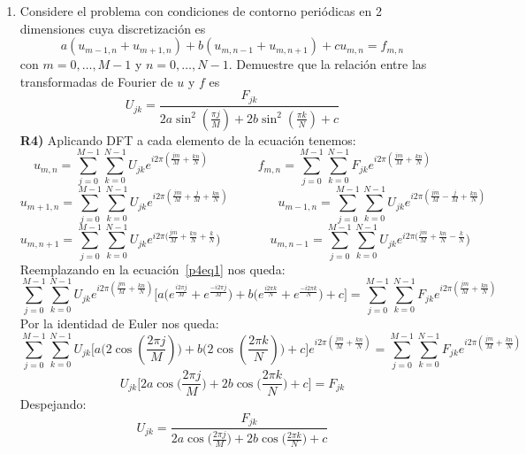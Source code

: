\documentclass{article}
\begin{document}
\begin{enumerate}
    \item Considere el problema con condiciones de contorno periódicas en 2 dimensiones cuya discretización es
    \begin{equation}\label{p4eq1}
        a(u_{m-1,n} + u_{m+1,n}) + b(u_{m,n-1}+u_{m,n+1}) + cu_{m,n} = f_{m,n}
    \end{equation}
    con $m=0,\dots,M-1$ y $n=0,\dots,N-1$. Demuestre que la relación entre las transformadas de Fourier de $u$ y $f$ es
    \begin{equation}\label{p4eq2}
        U_{jk} = \frac{F_{jk}}{2a\sin^2(\frac{\pi j}{M})+2b\sin^2(\frac{\pi k}{N})+c}
    \end{equation}
    \textbf{R4)} Aplicando DFT a cada elemento de la ecuación tenemos:
        $$  u_{m,n} = \sum_{j=0}^{M-1} \sum_{k=0}^{N-1} U_{jk}
                e^{i2\pi(\frac{jm}{M} + \frac{kn}{N})}
            \qquad\qquad
            f_{m,n} = \sum_{j=0}^{M-1} \sum_{k=0}^{N-1} F_{jk}
                e^{i2\pi(\frac{jm}{M} + \frac{kn}{N})}  $$
        $$  u_{m+1,n} = \sum_{j=0}^{M-1} \sum_{k=0}^{N-1} U_{jk}
                e^{i2\pi(\frac{jm}{M} + \frac{j}{M}+ \frac{kn}{N})}
            \qquad\qquad
            u_{m-1,n} = \sum_{j=0}^{M-1} \sum_{k=0}^{N-1} U_{jk}
                e^{i2\pi(\frac{jm}{M} - \frac{j}{M} + \frac{kn}{N})}  $$
        $$  u_{m,n+1} = \sum_{j=0}^{M-1} \sum_{k=0}^{N-1} U_{jk}
                e^{i2\pi(\frac{jm}{M} + \frac{kn}{N} + \frac{k}{N}})
            \qquad\qquad
            u_{m,n-1} = \sum_{j=0}^{M-1} \sum_{k=0}^{N-1} U_{jk}
                e^{i2\pi(\frac{jm}{M} + \frac{kn}{N} - \frac{k}{N}})  $$
    Reemplazando en la ecuación~\ref{p4eq1} nos queda:
    $$ \sum_{j=0}^{M-1} \sum_{k=0}^{N-1} U_{jk}e^{i2\pi(\frac{jm}{M} + \frac{kn}{N})}
    \Big[ a \big(e^{\frac{i2\pi j}{M}} + e^{\frac{-i2\pi j}{M}} \big) +
          b \big(e^{\frac{i2\pi k}{N}} + e^{\frac{-i2\pi k}{N}} \big) + c \Big] 
    = \sum_{j=0}^{M-1} \sum_{k=0}^{N-1} F_{jk}e^{i2\pi(\frac{jm}{M} + \frac{kn}{N})}
    $$
    Por la identidad de Euler nos queda:
    $$ \sum_{j=0}^{M-1} \sum_{k=0}^{N-1} U_{jk}
    \Big[ a \big(2\cos (\frac{2\pi j}{M}) \big) +
          b \big(2\cos (\frac{2\pi k}{N}) \big) + c \Big] 
          e^{i2\pi(\frac{jm}{M} + \frac{kn}{N})}
    = \sum_{j=0}^{M-1} \sum_{k=0}^{N-1} F_{jk}e^{i2\pi(\frac{jm}{M} + \frac{kn}{N})}
    $$
    $$  U_{jk} \Big[ 2a \cos \big(\frac{2\pi j}{M}\big) +
        2b \cos \big(\frac{2\pi k}{N}\big) + c \Big] = F_{jk} $$
    Despejando:
    $$  U_{jk} = \frac{F_{jk}}{ 2a \cos \big(\frac{2\pi j}{M}\big) +
        2b \cos \big(\frac{2\pi k}{N}\big) + c }$$
    

\end{enumerate}
\end{document}
